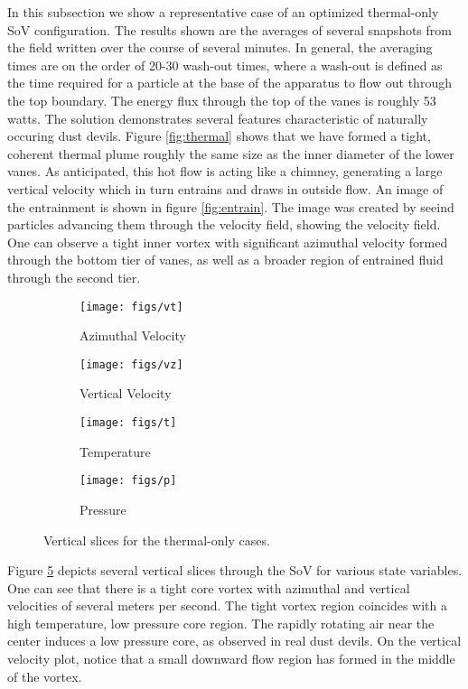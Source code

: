In this subsection we show a representative case of an optimized thermal-only SoV
configuration. The results shown are the averages of several snapshots
from the field written over the course of several minutes. In general,
the averaging times are on the order of 20-30 wash-out times, where a
wash-out is defined as the time required for a particle at the base of
the apparatus to flow out through the top boundary. The energy flux
through the top of the vanes is roughly 53 watts. The solution
demonstrates several features characteristic of naturally occuring dust
devils. Figure \ref{fig:thermal} shows that we have formed a tight,
coherent thermal plume roughly the same size as the inner diameter of the
lower vanes. As anticipated, this hot flow is acting like a chimney,
generating a large vertical velocity which in turn entrains and draws in
outside flow. An image of the entrainment is shown in figure
\ref{fig:entrain}. The image was created by seeind particles advancing
them through the velocity field, showing the velocity field. One can
observe a tight inner vortex with significant azimuthal velocity formed
through the bottom tier of vanes, as well as a broader region of
entrained fluid through the second tier. 

\begin{figure}[htb]

 \begin{subfigure}{.5\textwidth}
  \centering
  \texttt{[image: figs/vt]}
  \caption{Azimuthal Velocity}
  \label{fig:vt-to}
 \end{subfigure}%
 \begin{subfigure}{.5\textwidth}
  \centering
  \texttt{[image: figs/vz]}
  \caption{Vertical Velocity}
  \label{fig:vz-to}
 \end{subfigure}%


 \begin{subfigure}{.5\textwidth}
  \centering
  \texttt{[image: figs/t]}
  \caption{Temperature}
  \label{fig:t-to}
 \end{subfigure}%
 \begin{subfigure}{.5\textwidth}
  \centering
  \texttt{[image: figs/p]}
  \caption{Pressure}
  \label{fig:p-to}
 \end{subfigure}%

 \caption{Vertical slices for the thermal-only cases.}
 \label{fig:to-vert}
\end{figure}

%
%
%
Figure \ref{fig:to-vert} depicts several vertical slices through the SoV
for various state variables. One can see that there is a tight core
vortex with azimuthal and vertical velocities of several meters per
second. The tight vortex region coincides with a high temperature, low
pressure core region. The rapidly rotating air near the center induces
a low pressure core, as observed in real dust devils.
On the vertical velocity plot, notice that a small
downward flow region has formed in the middle of the vortex. 


